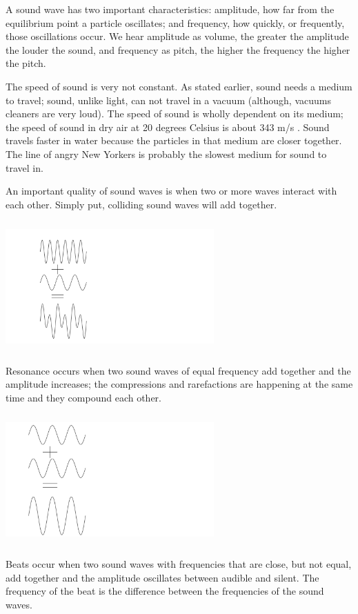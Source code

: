 \documentclass{tufte-handout}
\begin{document}
A sound wave has two important characteristics: amplitude, how far from the equilibrium point a particle oscillates; and frequency, how quickly, or frequently, those oscillations occur. We hear amplitude as volume, the greater the amplitude the louder the sound, and frequency as pitch, the higher the frequency the higher the pitch.

The speed of sound is very not constant. As stated earlier, sound needs a medium to travel; sound, unlike light, can not travel in a vacuum (although, vacuums cleaners are very loud). The speed of sound is wholly dependent on its medium; the speed of sound in dry air at 20 degrees Celsius is about 343 m/s \cite{Sound}. Sound travels faster in water because the particles in that medium are closer together. The line of angry New Yorkers is probably the slowest medium for sound to travel in.

An important quality of sound waves is when two or more waves interact with each other. Simply put, colliding sound waves will add together.

	\includegraphics[width=8cm, height=5cm]{Collision.png}

	Resonance occurs when two sound waves of equal frequency add together and the amplitude increases; the compressions and rarefactions are happening at the same time and they compound each other.

	\includegraphics[width=8cm, height=5cm]{Resonance.png}

	Beats occur when two sound waves with frequencies that are close, but not equal, add together and the amplitude oscillates between audible and silent. The frequency of the beat is the difference between the frequencies of the sound waves.
\end{document}
